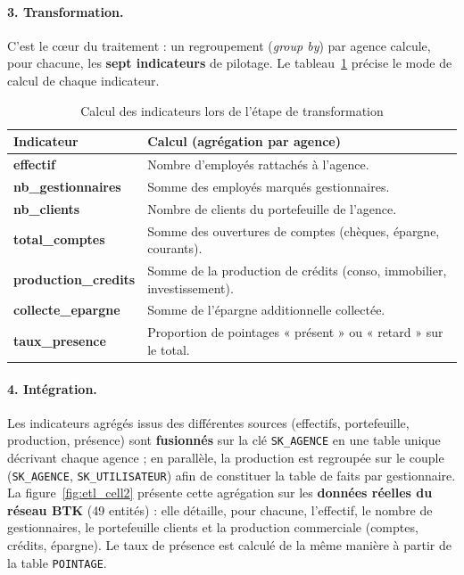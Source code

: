 \paragraph{3. Transformation.} C'est le cœur du traitement : un regroupement
(\emph{group by}) par agence calcule, pour chacune, les \textbf{sept indicateurs}
de pilotage. Le tableau~\ref{tab:etl_calc} précise le mode de calcul de chaque
indicateur.

\begin{table}[htbp]
\centering
\caption{Calcul des indicateurs lors de l'étape de transformation}
\label{tab:etl_calc}
\renewcommand{\arraystretch}{1.2}
\begin{tabularx}{\textwidth}{|>{\bfseries\ttfamily}p{3.6cm}|X|}
\hline
\textmd{\textbf{Indicateur}} & \textbf{Calcul (agrégation par agence)}\\
\hline
effectif & Nombre d'employés rattachés à l'agence.\\
\hline
nb\_gestionnaires & Somme des employés marqués gestionnaires.\\
\hline
nb\_clients & Nombre de clients du portefeuille de l'agence.\\
\hline
total\_comptes & Somme des ouvertures de comptes (chèques, épargne, courants).\\
\hline
production\_credits & Somme de la production de crédits (conso, immobilier, investissement).\\
\hline
collecte\_epargne & Somme de l'épargne additionnelle collectée.\\
\hline
taux\_presence & Proportion de pointages « présent » ou « retard » sur le total.\\
\hline
\end{tabularx}
\end{table}

\needspace{9.4cm}%
\paragraph{4. Intégration.} Les indicateurs agrégés issus des différentes sources
(effectifs, portefeuille, production, présence) sont \textbf{fusionnés} sur la clé
\texttt{SK\_AGENCE} en une table unique décrivant chaque agence ; en parallèle, la
production est regroupée sur le couple (\texttt{SK\_AGENCE},
\texttt{SK\_UTILISATEUR}) afin de constituer la table de faits par gestionnaire. La
figure~\ref{fig:etl_cell2} présente cette agrégation sur les \textbf{données réelles
du réseau BTK} (49 entités) : elle détaille, pour chacune, l'effectif, le
nombre de gestionnaires, le portefeuille clients et la production commerciale
(comptes, crédits, épargne). Le taux de présence est calculé de la même manière à
partir de la table \texttt{POINTAGE}.

